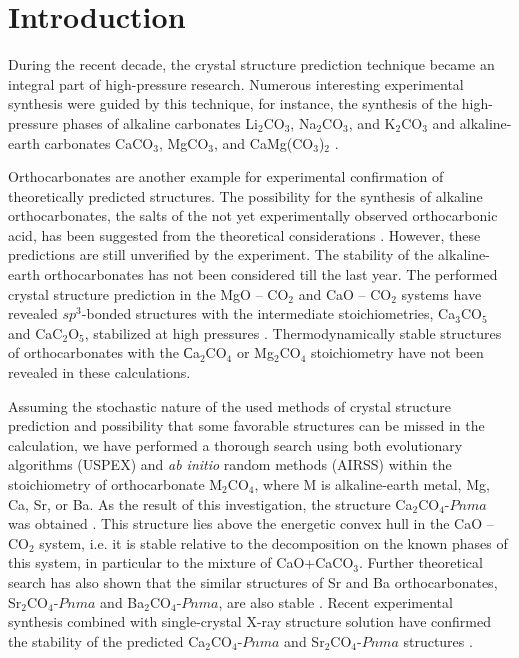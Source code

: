 \documentclass[a4paperm]{article}
\begin{document}
\section*{Introduction}

During the recent decade, the crystal structure prediction technique became an integral part of high-pressure research. 
Numerous interesting experimental synthesis were guided by this technique, for instance, the synthesis of the high-pressure phases of alkaline carbonates Li$_2$CO$_3$, Na$_2$CO$_3$, and K$_2$CO$_3$ \cite{gavr2016, gavr2019_alk, grzechnik2003}  and alkaline-earth carbonates CaCO$_3$, MgCO$_3$, and CaMg(CO$_3$)$_2$ \cite{oganov2006, pickard2015, gavr2017_aragII, smith2018, solomatova2017_fedol, binck2020_dol, merlini2017_dol}.
 
Orthocarbonates are another example for experimental confirmation of theoretically predicted structures.
The possibility for the synthesis of alkaline orthocarbonates, the salts of the not yet experimentally observed orthocarbonic acid, has been suggested from the theoretical considerations \cite{alshemali2002, cancarevich2007}.
However, these predictions are still unverified by the experiment.
The stability of the alkaline-earth orthocarbonates has not been considered till the last year.
The performed crystal structure prediction in the MgO -- CO$_2$ and CaO -- CO$_2$ systems have revealed $sp^3$-bonded structures with the intermediate stoichiometries,  Ca$_3$CO$_5$ and CaC$_2$O$_5$, stabilized at high pressures \cite{yao2018}. 
Thermodynamically stable structures of orthocarbonates with the Сa$_2$CO$_4$ or Mg$_2$CO$_4$ stoichiometry  have not been revealed in these calculations.

Assuming the stochastic nature of the used methods of crystal structure prediction and possibility that some favorable structures can be missed in the calculation, we have performed a thorough search using both evolutionary algorithms (USPEX) and {\it ab initio} random methods (AIRSS) within the stoichiometry of orthocarbonate M$_2$CO$_4$, where M is alkaline-earth metal, Mg, Ca, Sr, or Ba.
As the result of this investigation, the structure Ca$_2$CO$_4$-$Pnma$ was obtained \cite{sagatova2020_ortho}.
This structure lies above the energetic convex hull in the CaO -- CO$_2$ system, i.e. it is stable relative to the decomposition on the known phases of this system, in particular to the mixture of CaO+CaCO$_3$.
Further theoretical search has also shown that the similar structures of Sr and Ba orthocarbonates, Sr$_2$CO$_4$-$Pnma$ and Ba$_2$CO$_4$-$Pnma$, are also stable \cite{gavr2020_htxrd}. 
Recent experimental synthesis combined with single-crystal X-ray structure solution have confirmed the stability of the predicted Ca$_2$CO$_4$-$Pnma$ and Sr$_2$CO$_4$-$Pnma$ structures \cite{laniel2021}.
\end{document}
